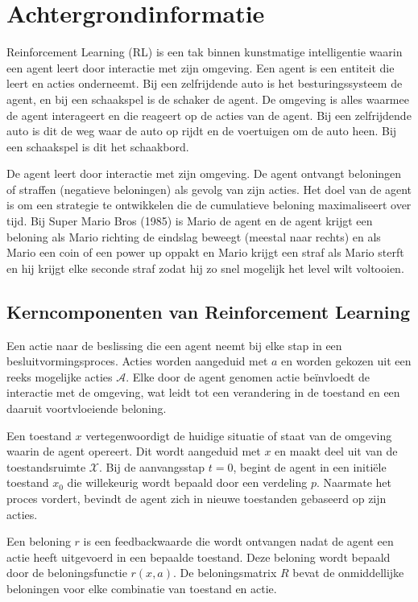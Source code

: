 \documentclass[a4paper,12pt]{article}
\begin{document}
\section{Achtergrondinformatie}
Reinforcement Learning (RL) is een tak binnen kunstmatige intelligentie waarin
een agent leert door interactie met zijn omgeving. Een agent is een entiteit
die leert en acties onderneemt. Bij een zelfrijdende auto is het
besturingssysteem de agent, en bij een schaakspel is de schaker de agent. De
omgeving is alles waarmee de agent interageert en die reageert op de acties van
de agent. Bij een zelfrijdende auto is dit de weg waar de auto op rijdt en de
voertuigen om de auto heen. Bij een schaakspel is dit het schaakbord.

De agent leert door interactie met zijn omgeving. De agent ontvangt beloningen
of straffen (negatieve beloningen) als gevolg van zijn acties. Het doel van de
agent is om een strategie te ontwikkelen die de cumulatieve beloning
maximaliseert over tijd. Bij Super Mario Bros (1985) is Mario de agent en de
agent krijgt een beloning als Mario richting de eindslag beweegt (meestal naar
rechts) en als Mario een coin of een power up oppakt en Mario krijgt een straf
als Mario sterft en hij krijgt elke seconde straf zodat hij zo snel mogelijk
het level wilt voltooien.
\subsection{Kerncomponenten van Reinforcement Learning}
Een actie naar de beslissing die een agent neemt bij elke stap in een
besluitvormingsproces. Acties worden aangeduid met \( a \) en worden gekozen
uit een reeks mogelijke acties \( \mathcal{A} \). Elke door de agent genomen
actie beïnvloedt de interactie met de omgeving, wat leidt tot een verandering
in de toestand en een daaruit voortvloeiende beloning.

Een toestand \( x \) vertegenwoordigt de huidige situatie of staat van de
omgeving waarin de agent opereert. Dit wordt aangeduid met \( x \) en maakt
deel uit van de toestandsruimte \( \mathcal{X} \). Bij de aanvangsstap \( t = 0
\), begint de agent in een initiële toestand \( x_0 \) die willekeurig wordt
bepaald door een verdeling \( p \). Naarmate het proces vordert, bevindt de
agent zich in nieuwe toestanden gebaseerd op zijn acties.

Een beloning \( r \) is een feedbackwaarde die wordt ontvangen nadat de agent
een actie heeft uitgevoerd in een bepaalde toestand. Deze beloning wordt
bepaald door de beloningsfunctie \( r(x, a) \). De beloningsmatrix \( R \)
bevat de onmiddellijke beloningen voor elke combinatie van toestand en actie.
\end{document}
